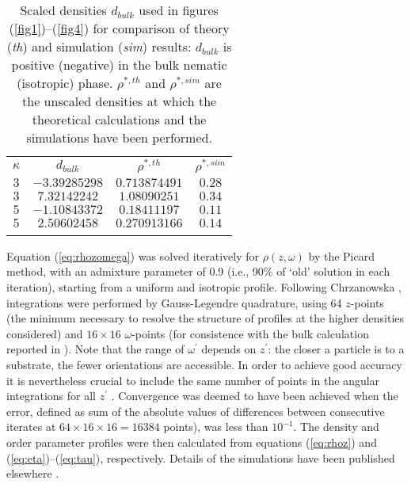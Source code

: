 \documentclass[aps,pre,twocolumn,groupedaddress,showpacs]{revtex4}
\begin{document}
\begin{table}
\begin{center}
\begin{tabular}{||c|c|c|c||}
	\hhline{|t:====:t|}
	$\kappa$   &$d_{bulk}$   &$\rho^{*,th}$   &$\rho^{*,sim}$ \\
	\hhline{||----||}
	$3$   &$-3.39285298$   &$0.713874491$   &$0.28$ \\
	$3$   &$7.32142242$   &$1.08090251$   &$0.34$ \\
	$5$   &$-1.10843372$   &$0.18411197$   &$0.11$ \\
	$5$   &$2.50602458$   &$0.270913166$   &$0.14$ \\
	\hhline{|b:====:b|}
\end{tabular}
\end{center}
\caption{Scaled densities $d_{bulk}$ used in figures 
(\protect\ref{fig1})--(\protect\ref{fig4}) for comparison of theory
({\it th}) and simulation ({\it sim}) results: $d_{bulk}$ is positive
(negative) in the bulk nematic (isotropic) phase. $\rho^{*,th}$ and 
$\rho^{*,sim}$ are the unscaled densities at which the theoretical 
calculations and the simulations have been performed.} 
\label{table2} 
\end{table}

Equation (\ref{eq:rhozomega}) was solved iteratively for $\rho(z,\omega)$ 
by the Picard method, with an admixture parameter of 0.9 (i.e., 90\% of `old' 
solution in each iteration), starting from a uniform and isotropic profile. 
Following Chrzanowska \cite{Chrzanowska:unpub}, integrations were performed 
by Gauss-Legendre quadrature, using 64 $z$-points (the minimum necessary to
resolve the structure of profiles at the higher densities considered) and
$16\times 16$ $\omega$-points (for consistence with the bulk calculation
reported in \cite{Chrzanowska:2001}). Note that the range of $\omega^{\prime}$ 
depends on $z^{\prime}$: the closer a particle is to a substrate, the fewer 
orientations are accessible. In order to achieve good accuracy it is 
nevertheless crucial to include the same number of points in the angular 
integrations for all $z^{\prime}$ \cite{Chrzanowska:unpub}. Convergence 
was deemed to have been achieved when the error, defined as sum of the 
absolute values of differences between consecutive iterates at 
$64\times 16\times 16= 16384$ points), was less than $10^{-1}$.
The density and order parameter profiles were then calculated from 
equations (\ref{eq:rhoz}) and (\ref{eq:eta})--(\ref{eq:tau}), respectively. 
Details of the simulations have been published elsewhere 
\cite{Cleaver:2001,Barmes:2003}.\\
\end{document}
